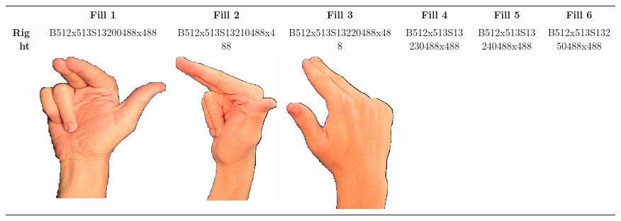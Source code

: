 \documentclass{article}
\begin{document}
\begin{center}
\begin{tabular}{r*{6}{c}}
&\textbf{Fill 1}&\textbf{Fill 2}&\textbf{Fill 3}&\textbf{Fill 4}&\textbf{Fill 5}&\textbf{Fill 6}\\
\multirow{2}{*}{\textbf{Right}}&
B512x513S13200488x488&
B512x513S13210488x488&
B512x513S13220488x488&
B512x513S13230488x488&
B512x513S13240488x488&
B512x513S13250488x488\\
&
\includegraphics[scale=0.1]{images/03-08-1.jpg}&
\includegraphics[scale=0.1]{images/03-08-2.jpg}&
\includegraphics[scale=0.1]{images/03-08-3.jpg}&

\end{tabular}
\end{center}
\end{document}
